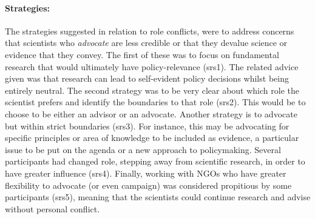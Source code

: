 \paragraph{Strategies:}
The strategies suggested in relation to role conflicts, were to address concerns that scientists who \emph{advocate} are less credible or that they devalue science or evidence that they convey. The first of these was to focus on fundamental research that would ultimately have policy-relevance (srs1). The related advice given was that research can lead to self-evident policy decisions whilst being entirely neutral. The second strategy was to be very clear about which role the scientist prefers and identify the boundaries to that role (srs2). This would be to choose to be either an advisor or an advocate. Another strategy is to advocate but within strict boundaries (srs3). For instance, this may be advocating for specific principles or area of knowledge to be included as evidence, a particular issue to be put on the agenda or a new approach to policymaking. Several participants had changed role, stepping away from scientific research, in order to have greater influence (srs4). Finally, working with NGOs who have greater flexibility to advocate (or even campaign) was considered propitious by some participants (srs5), meaning that the scientists could continue research and advise without personal conflict.

\subsubsection{\ismst}\label{sec:restastes}


